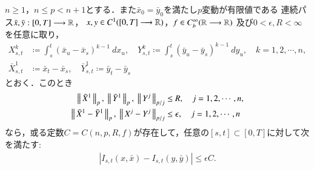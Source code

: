 	\begin{screen}
		\begin{thm}[連続性定理の拡張]
			$n \geq 1$，$n \leq p < n+1$とする．また$\bar{x}_0 = \bar{y}_0$を満たし$p$変動が有限値である
			連続パス$\bar{x},\bar{y}:[0,T] \longrightarrow \mathbb{R}$，
			$x,y \in C^1([0,T] \longrightarrow \mathbb{R})$，$f \in C^\infty_b(\mathbb{R} \longrightarrow \mathbb{R})$\footnotemark
			及び$0 < \epsilon ,R < \infty$を任意に取り，
			\begin{align}
				X^k_{s,t} &\coloneqq \int_s^t (\bar{x}_u - \bar{x}_s)^{k-1}\ dx_u,
				\quad Y^k_{s,t} \coloneqq \int_s^t (\bar{y}_u - \bar{y}_s)^{k-1}\ dy_u,
				\quad k=1,2,\cdots,n, \\
				\bar{X}^1_{s,t} &\coloneqq \bar{x}_t - \bar{x}_s,
				\quad \bar{Y}^1_{s,t} \coloneqq \bar{y}_t - \bar{y}_s
			\end{align}
			とおく．このとき
			\begin{align}
				\Norm{\bar{X}^1}{p},\ \Norm{\bar{Y}^1}{p},\ \Norm{Y^j}{p/j} &\leq R,
				\quad j=1,2,\cdots,n, \\
				\Norm{\bar{X}^1 - \bar{Y}^1}{p},\ \Norm{X^j - Y^j}{p/j} &\leq \epsilon,
				\quad j=1,2,\cdots,n
			\end{align}
			なら，或る定数$C = C(n,p,R,f)$が存在して，任意の$[s,t] \subset [0,T]$に対して次を満たす:
			\begin{align}
				\left| I_{s,t}(x,\bar{x}) - I_{s,t}(y,\bar{y}) \right| \leq \epsilon C.
			\end{align}
		\end{thm}
	\end{screen}

